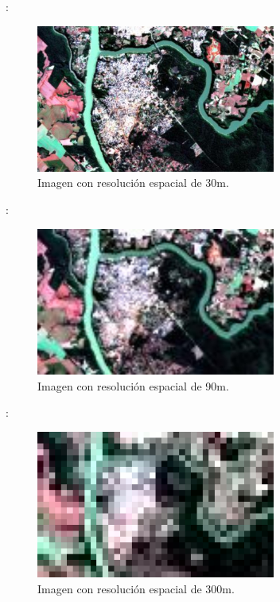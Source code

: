\documentclass[handout,aspectratio=169]{beamer}
\begin{document}
\begin{frame}{\secname : \subsecname}
    \begin{figure}[h!]
        \centering
        \includegraphics[width=0.7\textwidth]{fig:30m.jpg}
        \caption{Imagen con resolución espacial de 30m.}
    \end{figure}
\end{frame}

\begin{frame}{\secname : \subsecname}
    \begin{figure}[h!]
        \centering
        \includegraphics[width=0.7\textwidth]{fig:90m.jpg}
        \caption{Imagen con resolución espacial de 90m.}
    \end{figure}
\end{frame}

\begin{frame}{\secname : \subsecname}
    \begin{figure}[h!]
        \centering
        \includegraphics[width=0.7\textwidth]{fig:300m.jpg}
        \caption{Imagen con resolución espacial de 300m.}
    \end{figure}
\end{frame}
\end{document}
